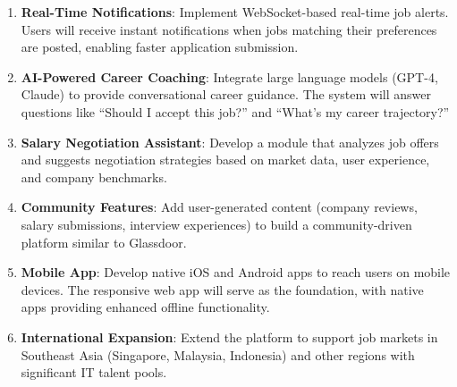 \begin{enumerate}
    \item \textbf{Real-Time Notifications}: Implement WebSocket-based real-time job alerts. Users will receive instant notifications when jobs matching their preferences are posted, enabling faster application submission.
    
    \item \textbf{AI-Powered Career Coaching}: Integrate large language models (GPT-4, Claude) to provide conversational career guidance. The system will answer questions like ``Should I accept this job?'' and ``What's my career trajectory?''
    
    \item \textbf{Salary Negotiation Assistant}: Develop a module that analyzes job offers and suggests negotiation strategies based on market data, user experience, and company benchmarks.
    
    \item \textbf{Community Features}: Add user-generated content (company reviews, salary submissions, interview experiences) to build a community-driven platform similar to Glassdoor.
    
    \item \textbf{Mobile App}: Develop native iOS and Android apps to reach users on mobile devices. The responsive web app will serve as the foundation, with native apps providing enhanced offline functionality.
    
    \item \textbf{International Expansion}: Extend the platform to support job markets in Southeast Asia (Singapore, Malaysia, Indonesia) and other regions with significant IT talent pools.
\end{enumerate}

